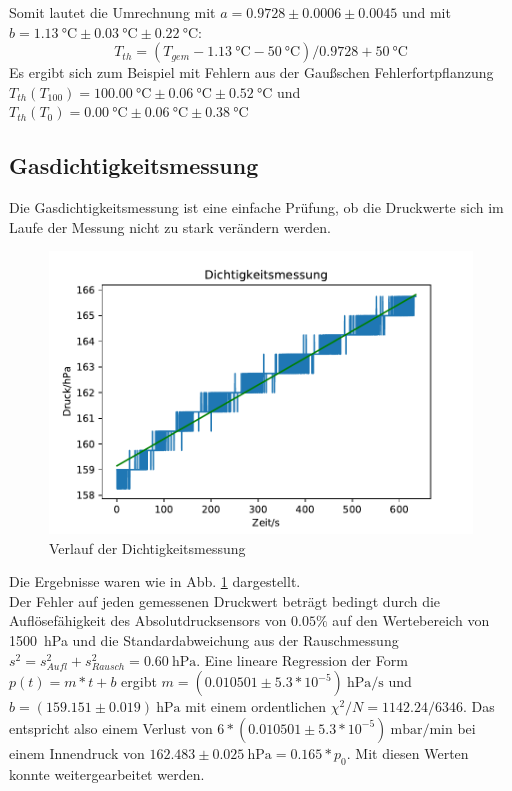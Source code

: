 \documentclass[]{article}
\begin{document}
Somit lautet die Umrechnung
mit $a = 0.9728 \pm 0.0006 \pm 0.0045$
und mit $b = \SI{1.13}{\celsius} \pm \SI{0.03}{\celsius} \pm \SI{0.22}{\celsius}$:
\begin{equation}
T_{th} = (T_{gem}-\SI{1.13}{\celsius}-\SI{50}{\celsius})/0.9728 + \SI{50}{\celsius}
\label{Kalibrierung}
\end{equation}
Es ergibt sich zum Beispiel mit Fehlern aus der Gaußschen Fehlerfortpflanzung $T_{th}(T_{100}) = \SI{100.00}{\celsius} \pm  \SI{0.06}{\celsius} \pm \SI{0.52}{\celsius}$
und $T_{th}(T_0) = \SI{0.00}{\celsius} \pm \SI{0.06}{\celsius} \pm \SI{0.38}{\celsius}$
\\
\subsection{Gasdichtigkeitsmessung}
Die Gasdichtigkeitsmessung ist eine einfache Prüfung, ob die Druckwerte sich im Laufe der Messung nicht zu stark verändern werden.\\
\begin{figure}
	\begin{center}
		\includegraphics[scale=0.9]{Images/Kalib_Dichtigkeitsmessung.pdf}
		\caption{Verlauf der Dichtigkeitsmessung}
		\label{GD_data}
	\end{center}
\end{figure}
Die Ergebnisse waren wie in Abb. \ref{GD_data} dargestellt. \\
Der Fehler auf jeden gemessenen Druckwert beträgt bedingt durch die Auflösefähigkeit des Absolutdrucksensors von $0.05\%$ auf den Wertebereich von \SI{1500}{\hecto \pascal} und die
 Standardabweichung aus der Rauschmessung $s^{2} = s^{2}_{Aufl}+s^{2}_{Rausch} = \SI{0.60}{\hecto \pascal}$. 
Eine lineare Regression der Form $p(t)=m*t+b$ ergibt $m = (0.010501 \pm 5.3*10^{-5})\SI{}{\hecto \pascal/ \second}$ und $b = (159.151 \pm 0.019)\SI{}{\hecto \pascal}$ mit einem ordentlichen $\chi ^{2}/N=1142.24 / 6346$. Das entspricht also einem Verlust von $6*(0.010501 \pm 5.3*10^{-5})\SI{}{\milli \bar / \minute}$ bei einem Innendruck von $162.483 \pm 0.025 \SI{}{\hecto \pascal} = 0.165*p_0$. Mit diesen Werten konnte weitergearbeitet werden.
\end{document}
